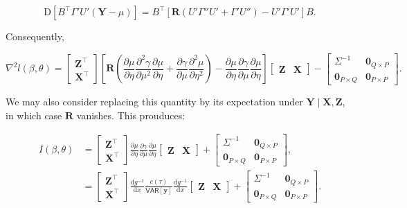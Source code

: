 \documentclass[10pt]{article}
\newcommand{\VAR}{\mathsf{VAR}}
\begin{document}
\begin{equation*}
\mathrm{D}\left[ B^\top \Gamma'U'(\bm{Y} - \mu) \right] =
B^\top\left[\bm{R}(U'\Gamma''U' +\Gamma'U'') - U'\Gamma'U'\right] B.
\end{equation*}

Consequently,

\begin{equation*}
\nabla^2 l(\beta, \theta) =
\begin{bmatrix} \bm{Z}^\top \\ \bm{X}^\top \end{bmatrix}
\left[\bm{R}\left(\frac{\partial\mu}{\partial\eta}
    \frac{\partial^2\gamma}{\partial\mu^2}
    \frac{\partial\mu}{\partial\eta} + 
    \frac{\partial\gamma}{\partial\mu}
    \frac{\partial^2\mu}{\partial\eta^2} \right) -
  \frac{\partial\mu}{\partial\eta}
  \frac{\partial\gamma}{\partial\mu}
  \frac{\partial\mu}{\partial\eta}\right]
\begin{bmatrix} \bm{Z} & \bm{X} \end{bmatrix} -
\begin{bmatrix} \Sigma^{-1} & \bm{0}_{Q\times P} \\
\bm{0}_{P\times Q} & \bm{0}_{P\times P}
\end{bmatrix}.
\end{equation*}

We may also consider replacing this quantity by its expectation under
\(\bm{Y} \mid \bm{X}, \bm{Z}\), in which case $\bm{R}$ vanishes. This prouduces:

\begin{align*}
I(\beta, \theta) & =
\begin{bmatrix} \bm{Z}^\top \\ \bm{X}^\top \end{bmatrix}
\frac{\partial\mu}{\partial\eta}
\frac{\partial\gamma}{\partial\mu}
\frac{\partial\mu}{\partial\eta}
\begin{bmatrix} \bm{Z} & \bm{X} \end{bmatrix} +
\begin{bmatrix} \Sigma^{-1} & \bm{0}_{Q\times P} \\
\bm{0}_{P\times Q} & \bm{0}_{P\times P}
\end{bmatrix}, \\
& = 
\begin{bmatrix} \bm{Z}^\top \\ \bm{X}^\top \end{bmatrix}
\frac{\mathrm{d}g^{-1}}{\mathrm{d}x}
\frac{c(\tau)}{\VAR[\bm{y}]}
\frac{\mathrm{d}g^{-1}}{\mathrm{d}x}
\begin{bmatrix} \bm{Z} & \bm{X} \end{bmatrix} +
\begin{bmatrix} \Sigma^{-1} & \bm{0}_{Q\times P} \\
\bm{0}_{P\times Q} & \bm{0}_{P\times P}
\end{bmatrix}.
\end{align*}
\end{document}

